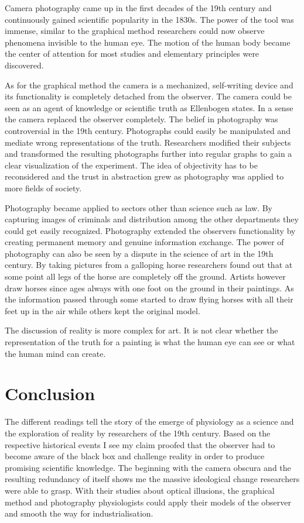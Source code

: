 \documentclass[12pt,a4paper]{article}
\begin{document}
Camera photography came up in the first decades of the 19th century and continuously gained scientific
popularity in the 1830s. The power of the tool was immense, similar to the graphical method researchers 
could now observe phenomena invisible to the human eye. The motion of the human body became the
center of attention for most studies and elementary principles were discovered.

As for the graphical method the camera is a mechanized, self-writing device and its functionality is
completely detached from the observer. The camera could be seen as an agent of knowledge or scientific
truth as Ellenbogen states. In a sense the camera replaced the observer completely.
The belief in photography was controversial in the 19th century.
Photographs could easily be manipulated and mediate wrong representations of the truth.
Researchers modified their subjects and transformed the resulting photographs further into regular
graphs to gain a clear visualization of the experiment. The idea of objectivity has to be
reconsidered and the trust in abstraction grew as photography was applied to more fields of society.

Photography became applied to sectors other than science such as law. By capturing images of criminals
and distribution among the other departments they could get easily recognized.
Photography extended the observers functionality by creating permanent memory and genuine information
exchange. The power of photography can also be seen by a dispute in the science of art in the 19th
century. By taking pictures from a galloping horse researchers found out that at some point all legs
of the horse are completely off the ground. Artists however draw horses since ages always with one foot
on the ground in their paintings. As the information passed through some started to draw flying horses with
all their feet up in the air while others kept the original model.

The discussion of reality is more complex for art. It is not clear whether the representation of the truth
for a painting is what the human eye can see or what the human mind can create.

\section*{Conclusion}

The different readings tell the story of the emerge of physiology as a science and the exploration of reality
by researchers of the 19th century. Based on the respective historical events I see my claim
proofed that the observer had to become aware of the black box and challenge reality in order to
produce promising scientific knowledge. The beginning with the camera obscura and the
resulting redundancy of itself shows me the massive ideological change researchers were able to grasp.
With their studies about optical illusions, the graphical method and photography physiologists could apply
their models of the observer and smooth the way for industrialisation.

\newpage



\end{document}
